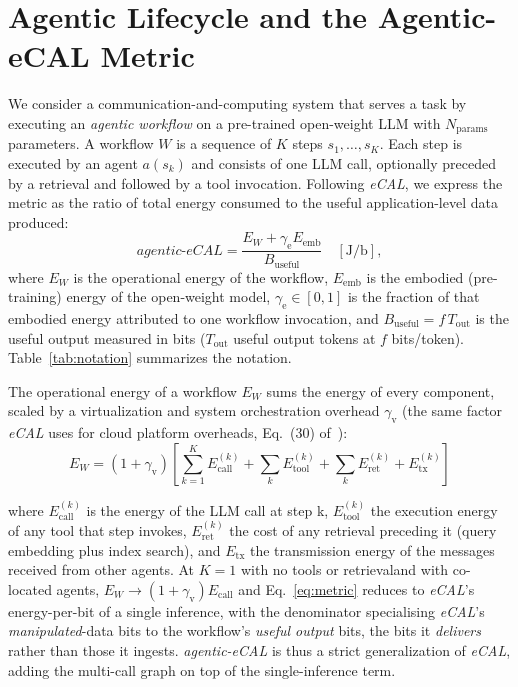 \documentclass[journal]{IEEEtran}
\newcommand{\agecal}{\textit{agentic-eCAL}}
\newcommand{\ecal}{\textit{eCAL}}
\begin{document}
\section{Agentic Lifecycle and the Agentic-eCAL Metric}\label{sec:metric}
We consider a communication-and-computing system that serves a task by executing an \emph{agentic
workflow} on a pre-trained open-weight LLM with $N_{\mathrm{params}}$ parameters. A workflow $W$ is a sequence of
$K$ steps $s_1,\dots,s_K$. Each step is executed by an agent $a(s_k)$ and consists of one LLM call,
optionally preceded by a retrieval and followed by a tool invocation. Following \ecal{}, we express
the metric as the ratio of total energy consumed to the useful application-level data produced:
\begin{equation}
\agecal = \frac{E_W + \gamma_{\mathrm{e}} E_{\mathrm{emb}}}{B_{\mathrm{useful}}} \quad [\mathrm{J/b}],
\label{eq:metric}
\end{equation}
where $E_W$ is the operational energy of the workflow, $E_{\mathrm{emb}}$ is the embodied
(pre-training) energy of the open-weight model, $\gamma_{\mathrm{e}}\in[0,1]$ is the fraction of that
embodied energy attributed to one workflow invocation, and
$B_{\mathrm{useful}} = f\,T_{\mathrm{out}}$ is the useful output measured in bits ($T_{\mathrm{out}}$
useful output tokens at $f$ bits/token). Table~\ref{tab:notation} summarizes the notation.

The operational energy of a workflow $E_{W}$ sums the energy of every component, scaled by a virtualization and system 
orchestration overhead $\gamma_{\mathrm{v}}$ (the same factor \ecal{} uses for cloud platform
overheads, Eq.~(30) of~\cite{chou2026ecal}):
\begin{equation}
E_W = (1+\gamma_{\mathrm{v}})\!\left[\sum_{k=1}^{K} E_{\mathrm{call}}^{(k)} + \sum_{k} E_{\mathrm{tool}}^{(k)} + \sum_{k} E_{\mathrm{ret}}^{(k)} + E_{\mathrm{tx}}^{(k)}\right]
\label{eq:ew}
\end{equation}

\noindent where $E_{\mathrm{call}}^{(k)}$ is the energy of the LLM call at step k, $E_{\mathrm{tool}}^{(k)}$ the execution energy of any tool that step invokes, $E_{\mathrm{ret}}^{(k)}$ the cost of any retrieval preceding it (query embedding plus index search), and $E_{\mathrm{tx}}$ the transmission energy of the messages received from other  agents. At $\!K\!=\!1$ with no tools or retrievaland with co-located agents, $E_W\!\to\!(1{+}\gamma_{\mathrm{v}})E_{\mathrm{call}}$ and
Eq.~\eqref{eq:metric} reduces to \ecal{}'s energy-per-bit of a single inference, with the denominator
specialising \ecal{}'s \emph{manipulated}-data bits to the workflow's \emph{useful output} bits, the
bits it \emph{delivers} rather than those it ingests. \agecal{} is thus a strict generalization of
\ecal{}, adding the multi-call graph on top of the single-inference term.
\end{document}
